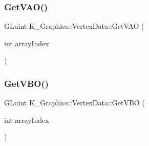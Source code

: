 \subsubsection{\texorpdfstring{Get\+V\+A\+O()}{GetVAO()}}
{\footnotesize\ttfamily G\+Luint K\+\_\+\+Graphics\+::\+Vertex\+Data\+::\+Get\+V\+AO (\begin{DoxyParamCaption}\item[{int}]{array\+Index }\end{DoxyParamCaption})}

\mbox{\label{class_k___graphics_1_1_vertex_data_a56ad045ab3baf95d6954c6ad1386a44d}} 
\subsubsection{\texorpdfstring{Get\+V\+B\+O()}{GetVBO()}}
{\footnotesize\ttfamily G\+Luint K\+\_\+\+Graphics\+::\+Vertex\+Data\+::\+Get\+V\+BO (\begin{DoxyParamCaption}\item[{int}]{array\+Index }\end{DoxyParamCaption})}

